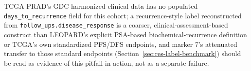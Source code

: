 TCGA-PRAD's GDC-harmonized clinical data has no populated \texttt{days\_to\_recurrence} field
for this cohort; a recurrence-style label reconstructed from
\texttt{follow\_ups.disease\_response} is a coarser, clinical-assessment-based construct than
LEOPARD's explicit PSA-based biochemical-recurrence definition or TCGA's own standardized
PFS/DFS endpoints, and marker 7's attenuated transfer to those standard endpoints
(Section~\ref{sec:res-label-benchmark}) should be read as evidence of this pitfall in action,
not as a separate failure.
